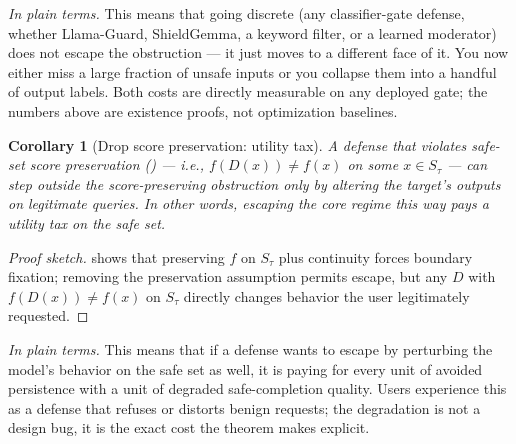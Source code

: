 \documentclass[11pt]{article}
\newtheorem{corollary}[theorem]{Corollary}
\begin{document}
\noindent\emph{In plain terms.} This means that going discrete (any
classifier-gate defense, whether Llama-Guard, ShieldGemma, a keyword
filter, or a learned moderator) does not escape the obstruction --- it
just moves to a different face of it. You now either miss a large
fraction of unsafe inputs or you collapse them into a handful of
output labels. Both costs are directly measurable on any deployed
gate; the numbers above are existence proofs, not optimization
baselines.

\begin{corollary}[Drop score preservation: utility tax]
\label{cor:drop-score}
A defense that violates safe-set score preservation
() --- i.e., $f(D(x)) \neq f(x)$ on some
$x \in S_\tau$ --- can step outside the score-preserving obstruction
only by altering the target's outputs on legitimate queries. In other
words, escaping the core regime this way pays a utility tax on the
safe set.
\end{corollary}
\begin{proof}[Proof sketch]
 shows that preserving $f$ on $S_\tau$ plus
continuity forces boundary fixation; removing the preservation
assumption permits escape, but any $D$ with $f(D(x)) \neq f(x)$ on
$S_\tau$ directly changes behavior the user legitimately requested.
\end{proof}

\noindent\emph{In plain terms.} This means that if a defense wants to
escape by perturbing the model's behavior on the safe set as well, it
is paying for every unit of avoided persistence with a unit of
degraded safe-completion quality. Users experience this as a defense
that refuses or distorts benign requests; the degradation is not a
design bug, it is the exact cost the theorem makes explicit.
\end{document}
